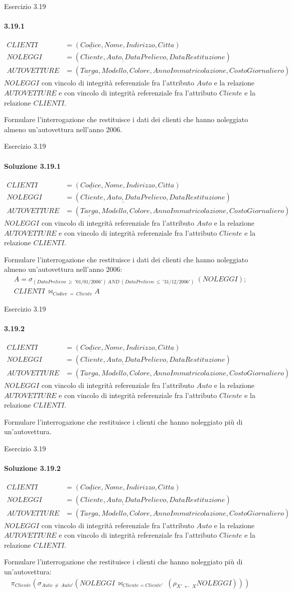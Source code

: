 \def\schemaEx3.19{\small \begin{align*}
    CLIENTI &= (\underline{Codice}, Nome, Indirizzo, Citta)\\
    NOLEGGI &= (\underline{Cliente, Auto, DataPrelievo}, DataRestituzione)\\
    AUTOVETTURE &= (\underline{Targa}, Modello, Colore, AnnoImmatricolazione, CostoGiornaliero)
    \end{align*}
    $NOLEGGI$ con vincolo di integrit\`a referenziale fra l'attributo $Auto$ e la relazione $AUTOVETTURE$ e con vincolo di integrit\`a referenziale fra l'attributo $Cliente$ e la relazione $CLIENTI$.}
\begin{frame}{Esercizio 3.19}
    \framesubtitle{3.19.1}
    \vspace{-3.cm}
    \schemaEx3.19
    \vspace{.3cm}

    Formulare l'interrogazione che restituisce i dati dei clienti che hanno noleggiato almeno un'autovettura nell'anno 2006.
\end{frame}
%
\begin{frame}{Esercizio 3.19}
    \framesubtitle{Soluzione 3.19.1}
    \vspace*{-2cm}
    \schemaEx3.19
    \vspace{.3cm}

    {\small Formulare l'interrogazione che restituisce i dati dei clienti che hanno noleggiato almeno un'autovettura nell'anno 2006:}
    \small
    \begin{gather*}
        A = \sigma_{(DataPrelievo~\geq~'01/01/2006')~AND~(DataPrelievo~\leq~'31/12/2006')}~(NOLEGGI);\\
        CLIENTI~\bowtie_{Codice~=~Cliente} A
    \end{gather*}
\end{frame}
%
\begin{frame}{Esercizio 3.19}
    \framesubtitle{3.19.2}
    \vspace{-3.cm}
    \schemaEx3.19
    \vspace{.3cm}

    Formulare l'interrogazione che restituisce i clienti che hanno noleggiato pi\`u di un'autovettura.
\end{frame}
%
\begin{frame}{Esercizio 3.19}
    \framesubtitle{Soluzione 3.19.2}
    \vspace*{-2cm}
    \schemaEx3.19
    \vspace{.3cm}

    {\small Formulare l'interrogazione che restituisce i clienti che hanno noleggiato pi\`u di un'autovettura:}
    \small
    \begin{gather*}
        \pi_{Cliente} (\sigma_{Auto~\neq~Auto'} (NOLEGGI~\bowtie_{Cliente=Cliente'}~(\rho_{X'~\leftarrow~X} NOLEGGI)))
    \end{gather*}
\end{frame}
